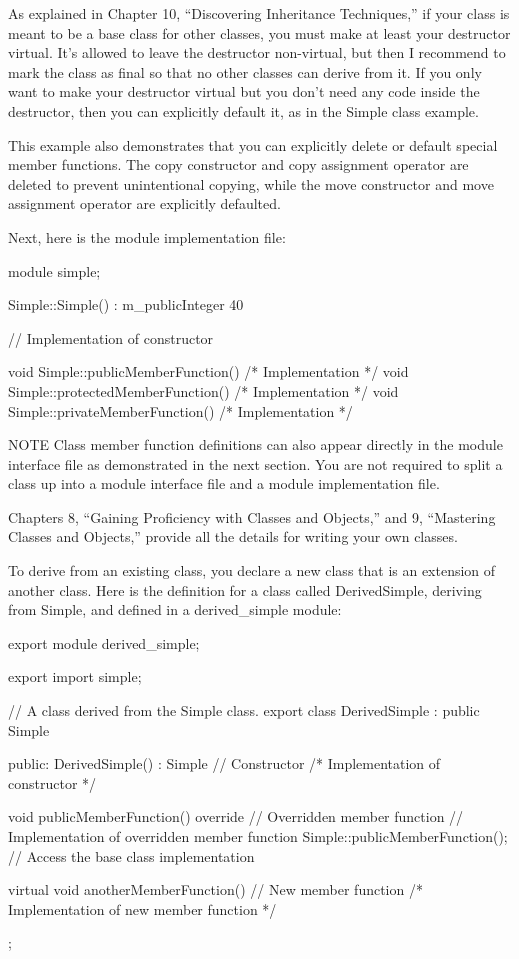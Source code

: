 As explained in Chapter 10, “Discovering Inheritance Techniques,” if your class is meant to be a base class for other classes, you must make at least your destructor virtual. It’s allowed to leave the destructor non-virtual, but then I recommend to mark the class as final so that no other classes can derive from it. If you only want to make your destructor virtual but you don’t need any code inside the destructor, then you can explicitly default it, as in the Simple class example.

This example also demonstrates that you can explicitly delete or default special member functions. The copy constructor and copy assignment operator are deleted to prevent unintentional copying, while the move constructor and move assignment operator are explicitly defaulted.

Next, here is the module implementation file:

\begin{cpp}
module simple;

Simple::Simple() : m_publicInteger { 40 }

{
    // Implementation of constructor
}

void Simple::publicMemberFunction() { /* Implementation */ }
void Simple::protectedMemberFunction() { /* Implementation */ }
void Simple::privateMemberFunction() { /* Implementation */ }
\end{cpp}

\begin{myNotic}{NOTE}
Class member function definitions can also appear directly in the module interface file as demonstrated in the next section. You are not required to split a class up into a module interface file and a module implementation file.
\end{myNotic}

Chapters 8, “Gaining Proficiency with Classes and Objects,” and 9, “Mastering Classes and Objects,” provide all the details for writing your own classes.


To derive from an existing class, you declare a new class that is an extension of another class. Here is the definition for a class called DerivedSimple, deriving from Simple, and defined in a derived\_simple module:

\begin{cpp}
export module derived_simple;

export import simple;

// A class derived from the Simple class.
export class DerivedSimple : public Simple
{
    public:
        DerivedSimple() : Simple{} // Constructor
        { /* Implementation of constructor */ }

        void publicMemberFunction() override // Overridden member function
        {
            // Implementation of overridden member function
            Simple::publicMemberFunction(); // Access the base class implementation
        }

        virtual void anotherMemberFunction() // New member function
        { /* Implementation of new member function */ }
};
\end{cpp}

